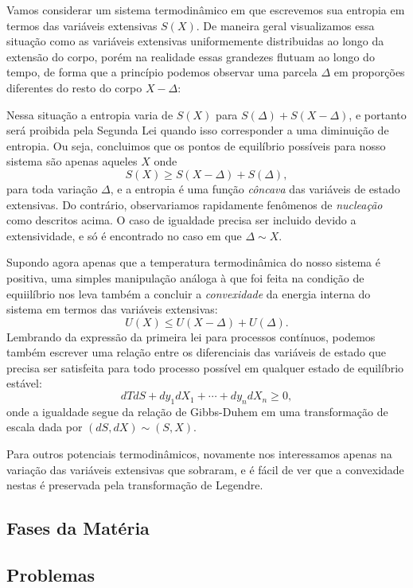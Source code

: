 Vamos considerar um sistema termodinâmico em que escrevemos sua entropia em
termos das variáveis extensivas $S(X)$. De maneira geral visualizamos essa
situação como as variáveis extensivas uniformemente distribuidas ao longo da
extensão do corpo, porém na realidade essas grandezes flutuam ao longo do tempo,
de forma que a princípio podemos observar uma parcela $\Delta$ em proporções
diferentes do resto do corpo $X-\Delta$:
\begin{figure}[H]
    \centering
\end{figure}
Nessa situação a entropia varia de $S(X)$ para $S(\Delta)+S(X-\Delta)$, e
portanto será proibida pela Segunda Lei quando isso corresponder a uma
diminuição de entropia. Ou seja, concluimos que os pontos de equilíbrio
possíveis para nosso sistema são apenas aqueles $X$ onde
$$S(X)\geq S(X-\Delta)+S(\Delta),$$
para toda variação $\Delta$, e a entropia é uma função \emph{côncava} das
variáveis de estado extensivas. Do contrário, observariamos rapidamente
fenômenos de \emph{nucleação} como descritos acima. O caso de igualdade precisa
ser incluido devido a extensividade, e só é encontrado no caso em que $\Delta
\sim X$.

Supondo agora apenas que a temperatura termodinâmica do nosso sistema é
positiva, uma simples manipulação análoga à que foi feita na condição de
equiilíbrio nos leva também a concluir a \emph{convexidade} da energia interna
do sistema em termos das variáveis extensivas:
$$U(X)\leq U(X-\Delta)+U(\Delta).$$
Lembrando da expressão da primeira lei para processos contínuos, podemos também
escrever uma relação entre os diferenciais das variáveis de estado que precisa
ser satisfeita para todo processo possível em qualquer estado de equilíbrio
estável:
$$dTdS+dy_1dX_1+\cdots+dy_ndX_n\geq0,$$
onde a igualdade segue da relação de Gibbs-Duhem em uma transformação de escala
dada por $(dS,dX)\sim(S,X)$.

Para outros potenciais termodinâmicos, novamente nos interessamos apenas na
variação das variáveis extensivas que sobraram, e é fácil de ver que a
convexidade nestas é preservada pela transformação de Legendre.

\subsection{Fases da Matéria}

\subsection{Problemas}
